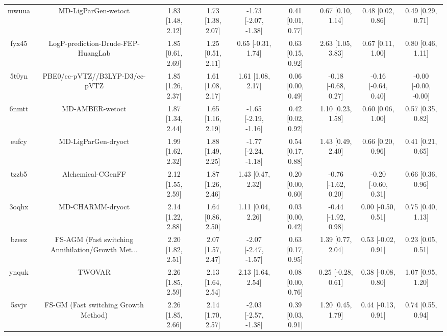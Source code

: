 \documentclass{article}
\begin{document}
\begin{center}
\begin{longtable}{|ccccccccc|}
 mwuua &                                MD-LigParGen-wetoct &  1.83 [1.48, 2.12] &  1.73 [1.38, 2.07] &  -1.73 [-2.07, -1.38] &  0.41 [0.01, 0.77] &    0.67 [0.10, 1.14] &    0.48 [0.02, 0.86] &     0.49 [0.29, 0.71] \\
 fyx45 &                 LogP-prediction-Drude-FEP-HuangLab &  1.85 [0.61, 2.69] &  1.25 [0.51, 2.11] &    0.65 [-0.31, 1.74] &  0.63 [0.15, 0.92] &    2.63 [1.05, 3.83] &    0.67 [0.11, 1.00] &     0.80 [0.46, 1.11] \\
 5t0yn &                     PBE0/cc-pVTZ//B3LYP-D3/cc-pVTZ &  1.85 [1.26, 2.37] &  1.61 [1.08, 2.17] &     1.61 [1.08, 2.17] &  0.06 [0.00, 0.49] &  -0.18 [-0.68, 0.27] &  -0.16 [-0.64, 0.40] &  -0.00 [-0.00, -0.00] \\
 6nmtt &                                    MD-AMBER-wetoct &  1.87 [1.34, 2.44] &  1.65 [1.16, 2.19] &  -1.65 [-2.19, -1.16] &  0.42 [0.02, 0.92] &    1.10 [0.23, 1.58] &    0.60 [0.06, 1.00] &     0.57 [0.35, 0.82] \\
 eufcy &                                MD-LigParGen-dryoct &  1.99 [1.62, 2.32] &  1.88 [1.49, 2.25] &  -1.77 [-2.24, -1.18] &  0.54 [0.17, 0.88] &    1.43 [0.49, 2.40] &    0.66 [0.20, 0.96] &     0.41 [0.21, 0.65] \\
 tzzb5 &                                  Alchemical-CGenFF &  2.12 [1.55, 2.59] &  1.87 [1.26, 2.46] &     1.43 [0.47, 2.32] &  0.20 [0.00, 0.60] &  -0.76 [-1.62, 0.20] &  -0.20 [-0.60, 0.31] &     0.66 [0.36, 0.96] \\
 3oqhx &                                   MD-CHARMM-dryoct &  2.14 [1.22, 2.88] &  1.64 [0.86, 2.50] &     1.11 [0.04, 2.26] &  0.03 [0.00, 0.42] &  -0.44 [-1.92, 0.98] &   0.00 [-0.50, 0.51] &     0.75 [0.40, 1.13] \\
 bzeez &  FS-AGM (Fast switching Annihilation/Growth Met... &  2.20 [1.82, 2.51] &  2.07 [1.57, 2.47] &  -2.07 [-2.47, -1.57] &  0.63 [0.17, 0.95] &    1.39 [0.77, 2.04] &   0.53 [-0.02, 0.91] &     0.23 [0.05, 0.51] \\
 ynquk &                                             TWOVAR &  2.26 [1.85, 2.59] &  2.13 [1.64, 2.54] &     2.13 [1.64, 2.54] &  0.08 [0.00, 0.76] &   0.25 [-0.28, 0.61] &   0.38 [-0.08, 0.80] &     1.07 [0.95, 1.20] \\
 5svjv &               FS-GM (Fast switching Growth Method) &  2.26 [1.85, 2.66] &  2.14 [1.70, 2.57] &  -2.03 [-2.57, -1.38] &  0.39 [0.03, 0.91] &    1.20 [0.45, 1.79] &   0.44 [-0.13, 0.91] &     0.74 [0.55, 0.94] \\

\end{longtable}
\end{center}
\end{document}
